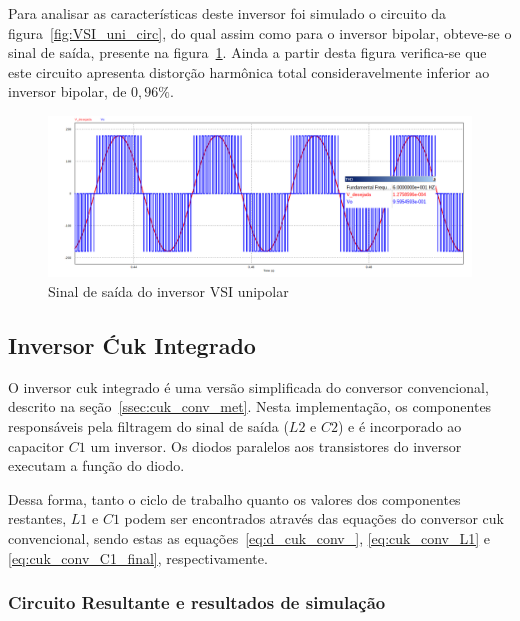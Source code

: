 \documentclass[
	12pt,				%
	openany,
	onseside,
	a4paper,			%
	english,			%
	french,				%
	spanish,			%
	brazil,				%
	]{abntex2}
\begin{document}
Para analisar as características deste inversor foi simulado o circuito da figura~\ref{fig:VSI_uni_circ}, do qual assim como para o inversor bipolar, obteve-se o sinal de saída, presente na figura~\ref{fig:response_vsi_uni}. Ainda a partir desta figura verifica-se que este circuito apresenta distorção harmônica total consideravelmente inferior ao inversor bipolar, de $0,96\%$.

\begin{figure}[H]%
	\centering
		\includegraphics[width= \linewidth]{vsi_uni_out}
		\caption{Sinal de saída do inversor VSI unipolar}
		\label{fig:response_vsi_uni}
\end{figure}

\subsection{Inversor Ćuk Integrado}

O inversor cuk integrado é uma versão simplificada do conversor convencional, descrito na seção~\ref{ssec:cuk_conv_met}. Nesta implementação, os componentes responsáveis pela filtragem do sinal de saída ($L2$ e $C2$) e é incorporado ao capacitor $C1$ um inversor. Os diodos paralelos aos transistores do inversor executam a função do diodo.

Dessa forma, tanto o ciclo de trabalho quanto os valores dos componentes restantes, $L1$ e $C1$ podem ser encontrados através das equações do conversor cuk convencional, sendo estas as equações~\ref{eq:d_cuk_conv_}, \ref{eq:cuk_conv_L1} e \ref{eq:cuk_conv_C1_final}, respectivamente.

\subsubsection{Circuito Resultante e resultados de simulação}
\end{document}
